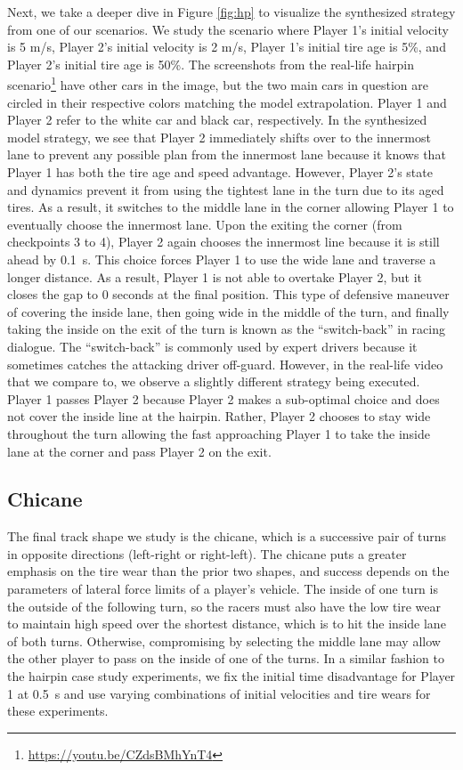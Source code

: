 Next, we take a deeper dive in Figure \ref{fig:hp} to visualize the synthesized strategy from one of our scenarios. We study the scenario where Player 1's initial velocity is 5 m/s, Player 2's initial velocity is 2 m/s, Player 1's initial tire age is 5\%, and Player 2's initial tire age is 50\%. The screenshots from the real-life hairpin scenario\footnote{\label{hairpinnote}\url{https://youtu.be/CZdsBMhYnT4}} have other cars in the image, but the two main cars in question are circled in their respective colors matching the model extrapolation. Player 1 and Player 2 refer to the white car and black car, respectively. In the synthesized model strategy, we see that Player 2 immediately shifts over to the innermost lane to prevent any possible plan from the innermost lane because it knows that Player 1 has both the tire age and speed advantage. However, Player 2's state and dynamics prevent it from using the tightest lane in the turn due to its aged tires. As a result, it switches to the middle lane in the corner allowing Player 1 to eventually choose the innermost lane. Upon the exiting the corner (from checkpoints 3 to 4), Player 2 again chooses the innermost line because it is still ahead by \SI{0.1}{\second}. This choice forces Player 1 to use the wide lane and traverse a longer distance. As a result, Player 1 is not able to overtake Player 2, but it closes the gap to 0 seconds at the final position. This type of defensive maneuver of covering the inside lane, then going wide in the middle of the turn, and finally taking the inside on the exit of the turn is known as the ``switch-back'' in racing dialogue. The ``switch-back'' is commonly used by expert drivers because it sometimes catches the attacking driver off-guard. However, in the real-life video that we compare to, we observe a slightly different strategy being executed. Player 1 passes Player 2 because Player 2 makes a sub-optimal choice and does not cover the inside line at the hairpin. Rather, Player 2 chooses to stay wide throughout the turn allowing the fast approaching Player 1 to take the inside lane at the corner and pass Player 2 on the exit. 

\FloatBarrier
\subsection{Chicane}
 The final track shape we study is the chicane, which is a successive pair of turns in opposite directions (left-right or right-left). The chicane puts a greater emphasis on the tire wear than the prior two shapes, and success depends on the parameters of lateral force limits of a player's vehicle. The inside of one turn is the outside of the following turn, so the racers must also have the low tire wear to maintain high speed over the shortest distance, which is to hit the inside lane of both turns. Otherwise, compromising by selecting the middle lane may allow the other player to pass on the inside of one of the turns. In a similar fashion to the hairpin case study experiments, we fix the initial time disadvantage for Player 1 at \SI{0.5}{\second} and use varying combinations of initial velocities and tire wears for these experiments.
 
